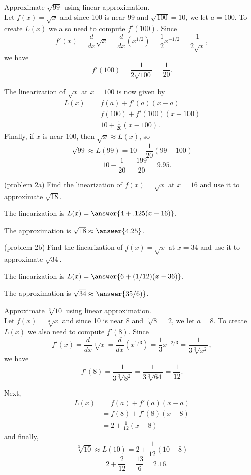 \documentclass{ximera}
\begin{document}
\begin{example}[example 2]
Approximate $\sqrt{99}$ using linear approximation. \\
Let $f(x) = \sqrt x$ and since 100 is near 99 and $\sqrt{100} = 10$, we let 
$a = 100$. To create $L(x)$ we also need to compute $f'(100)$. 
Since 
\[f'(x) = \frac{d}{dx} \sqrt x = \frac{d}{dx}(x^{1/2})= \frac{1}{2}x^{-1/2}   = \frac{1}{2\sqrt x},\] 
we have
\[f'(100) = \frac{1}{2\sqrt{100}} = \frac{1}{20}.\]

The linearization of $\sqrt x$ at $x=100$ is now given by
\begin{align*}
L(x) &= f(a) + f'(a)(x - a) \\
&= f(100) + f'(100)(x - 100) \\
&= 10 + \frac{1}{20}(x - 100).
\end{align*}
Finally, if $x$ is near 100, then $\sqrt x \approx L(x)$, so
\[\sqrt{99} \approx L(99) = 10 + \frac{1}{20}(99 - 100)\]
\[ = 10 - \frac{1}{20} = \frac{199}{20} = 9.95.\]
\end{example}

\begin{problem}(problem 2a)
Find the linearization of $f(x) = \sqrt x$ at $x = 16$ and use it to approximate $\sqrt{18}$.

The linearization is  $L(x) = \answer{4 + .125 (x-16)}$.

The approximation is $\sqrt{18} \approx \answer{4.25}$.
\end{problem}

\begin{problem}(problem 2b)
Find the linearization of $f(x) = \sqrt x$ at $x = 34$ and use it to approximate $\sqrt{34}$.

The linearization is  $L(x) = \answer{6 + (1/12) (x-36)}$.

The approximation is $\sqrt{34} \approx \answer{35/6)}$.
\end{problem}

\begin{example}[example 3]
Approximate $\sqrt[3]{10}$ using linear approximation.\\ 
Let $f(x) = \sqrt[3] x$ and since 10 is near 8 and $\sqrt[3]{8} = 2$, we let 
$a = 8$. To create $L(x)$ we also need to compute $f'(8)$. 
Since 
\[f'(x) = \frac{d}{dx} \sqrt[3] x = \frac{d}{dx}(x^{1/3})= \frac{1}{3}x^{-2/3}   = \frac{1}{3\sqrt[3] {x^2}},\] 
we have
\[f'(8) = \frac{1}{3\sqrt[3]{8^2}} =\frac{1}{3\sqrt[3]{64}}= \frac{1}{12}.\]

Next, 
\begin{align*}
L(x) &= f(a) + f'(a)(x - a) \\
&= f(8) + f'(8)(x - 8) \\
&= 2 + \frac{1}{12}(x - 8)
\end{align*}
and finally,
\[\sqrt[3]{10} \approx L(10) = 2 + \frac{1}{12}(10 - 8)\]
\[ = 2 + \frac{2}{12} = \frac{13}{6} = 2.1{\overline 6}.\]
\end{example}
\end{document}
